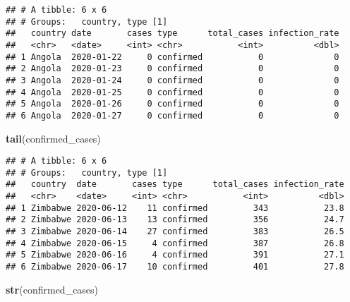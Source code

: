 \documentclass[
]{article}
\newenvironment{Shaded}{\begin{snugshade}}{\end{snugshade}}
\newcommand{\KeywordTok}[1]{\textcolor[rgb]{0.13,0.29,0.53}{\textbf{#1}}}
\newcommand{\NormalTok}[1]{#1}
\begin{document}
\begin{verbatim}
## # A tibble: 6 x 6
## # Groups:   country, type [1]
##   country date       cases type      total_cases infection_rate
##   <chr>   <date>     <int> <chr>           <int>          <dbl>
## 1 Angola  2020-01-22     0 confirmed           0              0
## 2 Angola  2020-01-23     0 confirmed           0              0
## 3 Angola  2020-01-24     0 confirmed           0              0
## 4 Angola  2020-01-25     0 confirmed           0              0
## 5 Angola  2020-01-26     0 confirmed           0              0
## 6 Angola  2020-01-27     0 confirmed           0              0
\end{verbatim}

\begin{Shaded}
\begin{Highlighting}[]
\KeywordTok{tail}\NormalTok{(confirmed_cases)}
\end{Highlighting}
\end{Shaded}

\begin{verbatim}
## # A tibble: 6 x 6
## # Groups:   country, type [1]
##   country  date       cases type      total_cases infection_rate
##   <chr>    <date>     <int> <chr>           <int>          <dbl>
## 1 Zimbabwe 2020-06-12    11 confirmed         343           23.8
## 2 Zimbabwe 2020-06-13    13 confirmed         356           24.7
## 3 Zimbabwe 2020-06-14    27 confirmed         383           26.5
## 4 Zimbabwe 2020-06-15     4 confirmed         387           26.8
## 5 Zimbabwe 2020-06-16     4 confirmed         391           27.1
## 6 Zimbabwe 2020-06-17    10 confirmed         401           27.8
\end{verbatim}

\begin{Shaded}
\begin{Highlighting}[]
\KeywordTok{str}\NormalTok{(confirmed_cases)}
\end{Highlighting}
\end{Shaded}
\end{document}
